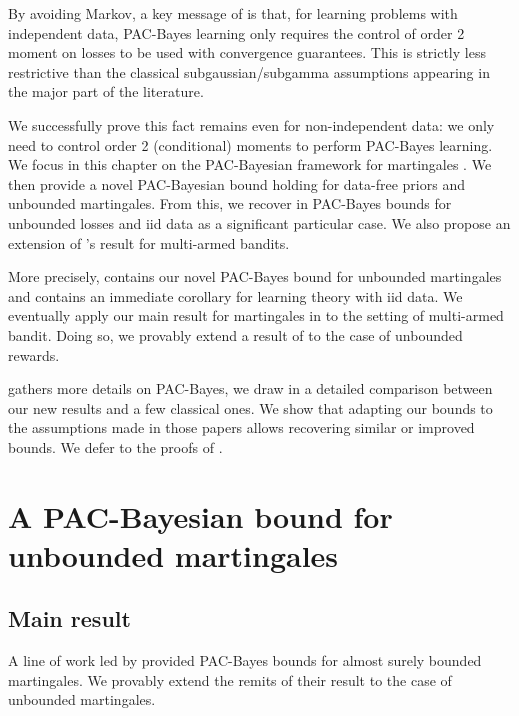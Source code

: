 By avoiding Markov, a key message of \citep{kuzborskij2019efron} is that, for learning problems with independent data, PAC-Bayes learning only requires the control of order 2 moment on losses to be used with convergence guarantees. This is strictly less restrictive than the classical subgaussian/subgamma assumptions appearing in the major part of the literature.

We successfully prove this fact remains even for non-independent data: we only need to control order 2 (conditional) moments to perform PAC-Bayes learning. We focus in this chapter on the PAC-Bayesian framework for martingales \citep{seldin2011pac,seldin2012bandit,seldin2012pac}.
We then provide a novel PAC-Bayesian bound holding for data-free priors and unbounded martingales. From this, we recover in PAC-Bayes bounds for unbounded losses and iid data as a significant particular case. We also propose an extension of \citet{seldin2012bandit}'s result for multi-armed bandits.

More precisely,  contains our novel PAC-Bayes bound for unbounded martingales and  contains an immediate corollary for learning theory with iid data. 
We eventually apply our main result for martingales in  to the setting of multi-armed bandit. Doing so, we provably extend a result of \citet{seldin2012bandit} to the case of unbounded rewards.

 gathers more details on PAC-Bayes,
we draw in  a detailed comparison between our new results and a few classical ones.  We show that adapting our bounds to the assumptions made in those papers allows recovering similar or improved bounds.
We defer to  the proofs of .





\section{A PAC-Bayesian bound for unbounded martingales}

\subsection{Main result}
\label{sec: main_result_mart}
A line of work led by \citet{seldin2011pac,seldin2012bandit,seldin2012pac} provided PAC-Bayes bounds for almost surely bounded martingales. We provably extend the remits of their result to the case of unbounded martingales.

